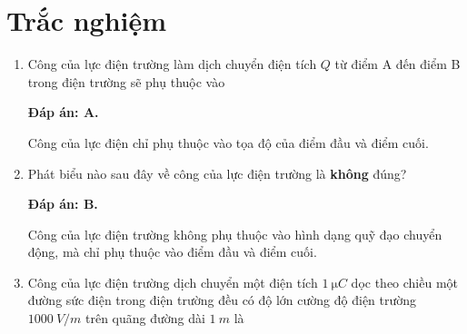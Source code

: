 \whiteBGstarBegin
\setcounter{section}{0}
\section{Trắc nghiệm}
\begin{enumerate}[label=\bfseries Câu \arabic*:]
	
	
	\item {}
	
	\cauhoi
	{Công của lực điện trường làm dịch chuyển điện tích $Q$ từ điểm A đến điểm B trong điện trường sẽ phụ thuộc vào
		
	}
	\loigiai
	{	\textbf{Đáp án: A.}
		
		Công của lực điện chỉ phụ thuộc vào tọa độ của điểm đầu và điểm cuối.
	}
	\item {}
	
	\cauhoi
	{Phát biểu nào sau đây về công của lực điện trường là \textbf{không} đúng?
		
	}
	\loigiai
	{	\textbf{Đáp án: B.}
		
		Công của lực điện trường không phụ thuộc vào hình dạng quỹ đạo chuyển động, mà chỉ phụ thuộc vào điểm đầu và điểm cuối.
	}
	\item {}
	
	\cauhoi
	{Công của lực điện trường dịch chuyển một điện tích $\SI{1}{\micro C}$ dọc theo chiều một đường sức điện trong điện trường đều có độ lớn cường độ điện trường $\SI{1000}{V/m}$ trên quãng đường dài $\SI{1}{m}$ là
		
}
\end{enumerate}
